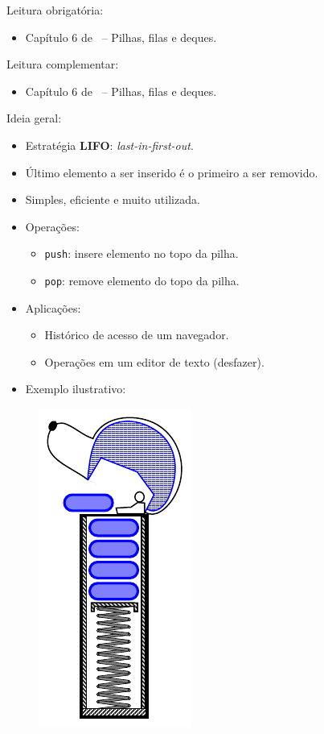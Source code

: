 \newcommand{\templatesdir}{../../../templates}
\newcommand{\template}{template-roteiro-est}


\newcommand{\content}{Pilhas, filas e deques}
\newcommand{\class}{Algoritmos e Estruturas de Dados}
\newcommand{\shortcourse}{45EST}



\makeheader

{
Leitura obrigatória:
\begin{itemize}
	\item Capítulo 6 de~\cite{GoodrichEtAl2014} -- Pilhas, filas e deques.
\end{itemize}

Leitura complementar:
\begin{itemize}
	\item Capítulo 6 de~\cite{Preiss2001} -- Pilhas, filas e deques.
\end{itemize}
}

\medskip


Ideia geral:
\begin{itemize}
	\item Estratégia \textbf{LIFO}: \textit{last-in-first-out}.
	\item Último elemento a ser inserido é o primeiro a ser removido.
	\item {\color{redtext} Simples, eficiente e muito utilizada.}
	\item Operações:
	\begin{itemize}
		\item \texttt{push}: insere elemento no topo da pilha.
		\item \texttt{pop}: remove elemento do topo da pilha.
	\end{itemize}
	\item Aplicações:
	\begin{itemize}
		\item Histórico de acesso de um navegador.
		\item Operações em um editor de texto (desfazer).
	\end{itemize}
\end{itemize}

\clearpage

\begin{itemize}
	\item Exemplo ilustrativo:
\end{itemize}

\begin{figure}[H]
	\centering
	\includegraphics[width=0.21\linewidth]{img/figure-6-1}
\end{figure}

